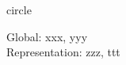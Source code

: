 \documentclass{article}
\begin{document}
\begin{Element}{circle}
    \begin{Required}
    \end{Required}
    \begin{Optional}
        Global: xxx, yyy\\
        Representation: zzz, ttt
    \end{Optional}
\end{Element}
\end{document}

